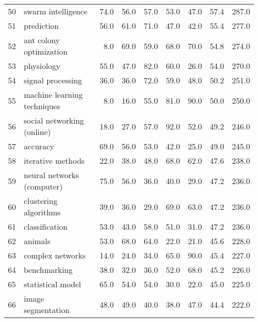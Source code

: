 \begin{tabular}{llrrrrrrr}
50 &                       swarm intelligence &    74.0 &    56.0 &    57.0 &    53.0 &    47.0 &    57.4 &   287.0 \\
51 &                               prediction &    56.0 &    61.0 &    71.0 &    47.0 &    42.0 &    55.4 &   277.0 \\
52 &                  ant colony optimization &     8.0 &    69.0 &    59.0 &    68.0 &    70.0 &    54.8 &   274.0 \\
53 &                               physiology &    55.0 &    47.0 &    82.0 &    60.0 &    26.0 &    54.0 &   270.0 \\
54 &                        signal processing &    36.0 &    36.0 &    72.0 &    59.0 &    48.0 &    50.2 &   251.0 \\
55 &              machine learning techniques &     8.0 &    16.0 &    55.0 &    81.0 &    90.0 &    50.0 &   250.0 \\
56 &               social networking (online) &    18.0 &    27.0 &    57.0 &    92.0 &    52.0 &    49.2 &   246.0 \\
57 &                                 accuracy &    69.0 &    56.0 &    53.0 &    42.0 &    25.0 &    49.0 &   245.0 \\
58 &                        iterative methods &    22.0 &    38.0 &    48.0 &    68.0 &    62.0 &    47.6 &   238.0 \\
59 &               neural networks (computer) &    75.0 &    56.0 &    36.0 &    40.0 &    29.0 &    47.2 &   236.0 \\
60 &                    clustering algorithms &    39.0 &    36.0 &    29.0 &    69.0 &    63.0 &    47.2 &   236.0 \\
61 &                           classification &    53.0 &    43.0 &    58.0 &    51.0 &    31.0 &    47.2 &   236.0 \\
62 &                                  animals &    53.0 &    68.0 &    64.0 &    22.0 &    21.0 &    45.6 &   228.0 \\
63 &                         complex networks &    14.0 &    24.0 &    34.0 &    65.0 &    90.0 &    45.4 &   227.0 \\
64 &                             benchmarking &    38.0 &    32.0 &    36.0 &    52.0 &    68.0 &    45.2 &   226.0 \\
65 &                        statistical model &    65.0 &    54.0 &    54.0 &    30.0 &    22.0 &    45.0 &   225.0 \\
66 &                       image segmentation &    48.0 &    49.0 &    40.0 &    38.0 &    47.0 &    44.4 &   222.0 \\

\end{tabular}
